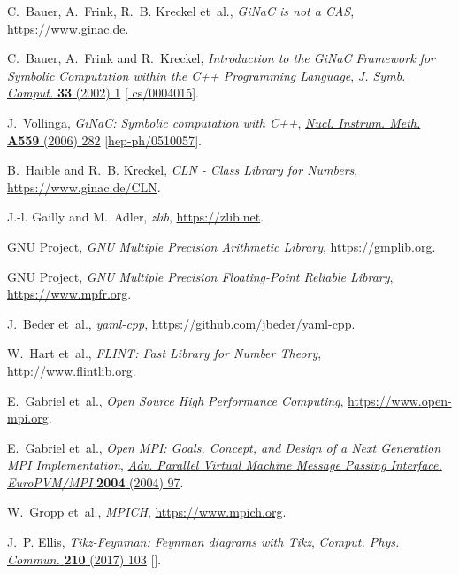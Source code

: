 \documentclass[11pt,a4paper,DIV=11,numbers=noenddot,parskip=half]{scrartcl}
\begin{document}
\begin{thebibliography}{10}
C.~Bauer, A.~Frink, R.~B. Kreckel et~al., \emph{{GiNaC is not a CAS}},
  \href{https://www.ginac.de}{https://www.ginac.de}.

C.~Bauer, A.~Frink and R.~Kreckel, \emph{{Introduction to the GiNaC Framework
  for Symbolic Computation within the C++ Programming Language}},
  \href{https://doi.org/10.1006/jsco.2001.0494}{\emph{J. Symb. Comput.}
  {\bfseries 33} (2002) 1} [\href{https://arxiv.org/abs/cs/0004015}{{\ttfamily
  cs/0004015}}].

J.~Vollinga, \emph{{GiNaC: Symbolic computation with C++}},
  \href{https://doi.org/10.1016/j.nima.2005.11.155}{\emph{Nucl. Instrum. Meth.}
  {\bfseries A559} (2006) 282}
  [\href{https://arxiv.org/abs/hep-ph/0510057}{{\ttfamily hep-ph/0510057}}].

B.~Haible and R.~B. Kreckel, \emph{{CLN - Class Library for Numbers}},
  \href{https://www.ginac.de/CLN}{https://www.ginac.de/CLN}.

J.-l. Gailly and M.~Adler, \emph{{zlib}},
  \href{https://zlib.net}{https://zlib.net}.

{GNU Project}, \emph{{GNU Multiple Precision Arithmetic Library}},
  \href{https://gmplib.org}{https://gmplib.org}.

{GNU Project}, \emph{{GNU Multiple Precision Floating-Point Reliable Library}},
   \href{https://www.mpfr.org}{https://www.mpfr.org}.

J.~Beder et~al., \emph{{yaml-cpp}},
  \href{https://github.com/jbeder/yaml-cpp}{https://github.com/jbeder/yaml-cpp}.

W.~Hart et~al., \emph{{FLINT: Fast Library for Number Theory}},
  \href{http://www.flintlib.org}{http://www.flintlib.org}.

E.~Gabriel et~al., \emph{{Open Source High Performance Computing}},
  \href{https://www.open-mpi.org}{https://www.open-mpi.org}.

E.~Gabriel et~al., \emph{{Open MPI: Goals, Concept, and Design of a Next
  Generation MPI Implementation}},
  \href{https://doi.org/10.1007/978-3-540-30218-6_19}{\emph{Adv. Parallel
  Virtual Machine Message Passing Interface. EuroPVM/MPI} {\bfseries 2004}
  (2004) 97}.

W.~Gropp et~al., \emph{{MPICH}},
  \href{https://www.mpich.org}{https://www.mpich.org}.

J.~P. Ellis, \emph{{Ti\textit{k}z-Feynman: Feynman diagrams with
  Ti\textit{k}z}},
  \href{https://doi.org/10.1016/j.cpc.2016.08.019}{\emph{Comput. Phys. Commun.}
  {\bfseries 210} (2017) 103}
  [\href{https://arxiv.org/abs/1601.05437}{{}}].

\end{thebibliography}\endgroup
\end{document}
